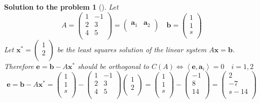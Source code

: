 \documentclass[12pt,a4]{article}
\newtheorem{solution}{Solution to the problem}
\newcommand{\ba}{{\mathbf a}}
\newcommand{\bb}{{\mathbf b}}
\newcommand{\be}{{\mathbf e}}
\newcommand{\bx}{{\mathbf x}}
\newcommand{\sprod}[2]{\left \langle #1, #2 \right \rangle}
\begin{document}
\begin{solution}[]\rm 
Let
\[
A = 
\begin{pmatrix}
1 & -1 \\
2 & 3 \\
4 & 5 \\
\end{pmatrix} =
\begin{pmatrix}
\ba_1 & \ba_2 \\
\end{pmatrix} \quad
\bb = 
\begin{pmatrix}
1 \\ 1 \\ s \\
\end{pmatrix}
\]
Let
$
\bx^* = 
\begin{pmatrix}
1 \\ 2 \\
\end{pmatrix}
$ be the least squares solution of the linear system $A\bx = \bb$. Therefore $\be = \bb-A\bx^*$ should be orthogonal to $C(A) \Leftrightarrow \sprod{\be}{\ba_i} = 0 \quad i = {1,2}$
\[
\be = \bb - A\bx^* = 
\begin{pmatrix}
1 \\ 1 \\ s \\
\end{pmatrix}
-
\begin{pmatrix}
1 & -1 \\
2 & 3 \\
4 & 5 \\
\end{pmatrix}
\begin{pmatrix}
1 \\ 2 \\
\end{pmatrix}
=
\begin{pmatrix}
1 \\ 1 \\ s \\
\end{pmatrix}
-
\begin{pmatrix}
-1 \\
8 \\
14 \\
\end{pmatrix}
=
\begin{pmatrix}
2 \\ -7 \\ s-14 \\
\end{pmatrix}
\]
\end{solution}
\end{document}
